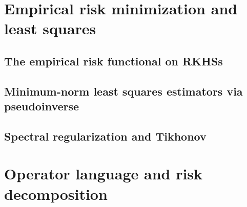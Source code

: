 %

\section{Empirical risk minimization and least squares}
\subsection{The empirical risk functional on RKHSs}
\subsection{Minimum-norm least squares estimators via pseudoinverse}
\subsection{Spectral regularization and Tikhonov}

\section{Operator language and risk decomposition}
